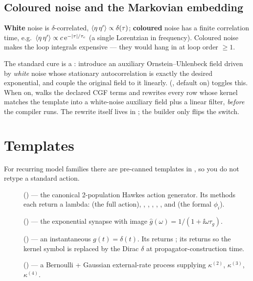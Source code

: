 \subsection{Coloured noise and the Markovian embedding}

\begin{defn}
\textbf{White} noise is $\delta$-correlated,
$\left\langle \eta\,\eta' \right\rangle\propto\delta(\tau)$; \textbf{coloured} noise has a finite
correlation time, e.g.\ $\left\langle \eta\,\eta' \right\rangle\propto c\,\mathrm{e}^{-|\tau|/\tau_c}$ (a
single Lorentzian in frequency). Coloured noise makes the loop integrals
expensive --- they would hang in  at loop order $\ge 1$.
\end{defn}

The standard cure is a : introduce an auxiliary
Ornstein--Uhlenbeck field driven by \emph{white} noise whose stationary
autocorrelation is exactly the desired exponential, and couple the original field
to it linearly.  (, default
on) toggles this. When on,  walks the declared CGF terms and
rewrites every row whose kernel matches the  template
into a white-noise auxiliary field plus a linear filter, \emph{before} the
compiler runs. The rewrite itself lives in
; the builder only flips the switch.

\section{Templates}

For recurring model families there are pre-canned templates in
, so you do not retype a standard action.

\begin{description}
  \item[] () --- the
        canonical 2-population Hawkes action generator. Its methods each return a
        lambda:  (the full \msrjd{} action),
        , ,
        , ,
        , and
         (the formal $\phi_i$).
  \item[] () ---
        the exponential synapse with image
        $\hat g(\omega)=1/(1+\ii\omega\tau_g)$.
  \item[] () --- an
        instantaneous $g(t)=\delta(t)$. Its  returns
        ; its  returns
         so the kernel symbol is replaced
        by the Dirac $\delta$ at propagator-construction time.
  \item[] () --- a
        Bernoulli + Gaussian external-rate process supplying $\kappa^{(2)}$,
        $\kappa^{(3)}$, $\kappa^{(4)}$.
\end{description}

